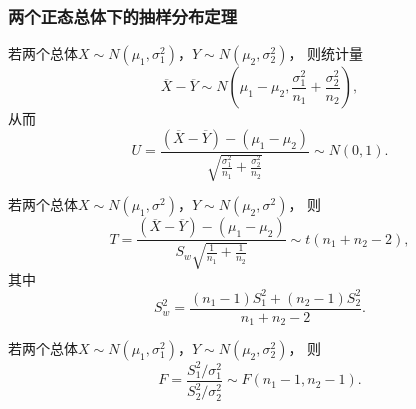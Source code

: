 \subsubsection{两个正态总体下的抽样分布定理}
\begin{theorem}
若两个总体\(X \sim N(\mu_1,\sigma_1^2)\)，\(Y \sim N(\mu_2,\sigma_2^2)\)，
则统计量\begin{equation}
	\overline{X}-\overline{Y}
	\sim
	N\left(\mu_1-\mu_2,\frac{\sigma_1^2}{n_1}+\frac{\sigma_2^2}{n_2}\right),
\end{equation}
从而\begin{equation}
	U = \frac{
		(\overline{X}-\overline{Y})-(\mu_1-\mu_2)
	}{
		\sqrt{\frac{\sigma_1^2}{n_1}+\frac{\sigma_2^2}{n_2}}
	}
	\sim
	N(0,1).
\end{equation}
\end{theorem}

\begin{theorem}
若两个总体\(X \sim N(\mu_1,\sigma^2)\)，\(Y \sim N(\mu_2,\sigma^2)\)，
则\begin{equation}
	T = \frac{
			(\overline{X}-\overline{Y})-(\mu_1-\mu_2)
		}{
			S_w \sqrt{\frac{1}{n_1}+\frac{1}{n_2}}
		}
	\sim
	t(n_1+n_2-2),
\end{equation}
其中\begin{equation*}
	S_w^2 = \frac{(n_1-1)S_1^2+(n_2-1)S_2^2}{n_1+n_2-2}.
\end{equation*}
\end{theorem}

\begin{theorem}
若两个总体\(X \sim N(\mu_1,\sigma_1^2)\)，\(Y \sim N(\mu_2,\sigma_2^2)\)，
则\begin{equation}
	F = \frac{S_1^2 / \sigma_1^2}{S_2^2 / \sigma_2^2} \sim F(n_1-1,n_2-1).
\end{equation}
\end{theorem}

